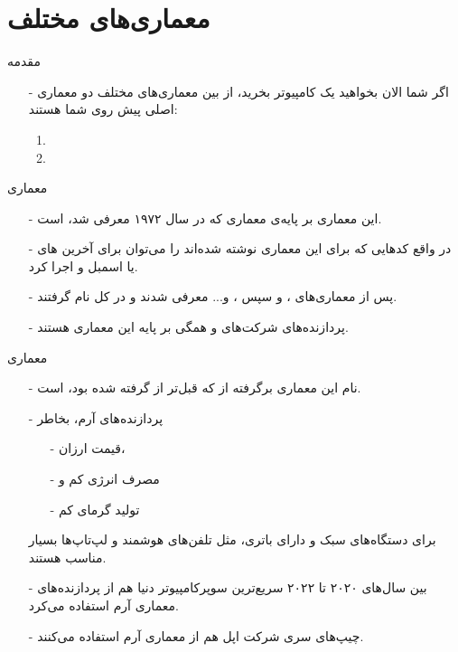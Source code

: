 \section{معماری‌های مختلف}
\begin{frame}{مقدمه}
\begin{itemize}\itemr
\item[-]
اگر شما الان بخواهید یک کامپیوتر بخرید، از بین معماری‌های مختلف دو معماری اصلی پیش روی شما هستند:
\begin{enumerate}\itemr
\item {}
\item {}
\end{enumerate}
\end{itemize}
\end{frame}

\begin{frame}{معماری }
\begin{itemize}\itemr
\item[-]
این معماری بر پایه‌ی معماری 
که در سال ۱۹۷۲ معرفی شد، است.
\item[-]
در واقع کد‌هایی که برای این معماری نوشته شده‌اند را می‌توان برای آخرین 
های
یا
اسمبل و اجرا کرد.
\item[-]
پس از
معماری‌های
،
 و سپس
،
و... معرفی شدند و در کل 
نام گرفتند.
\item[-]
پردازنده‌های شرکت‌های 
و 
همگی بر پایه این معماری هستند.
\end{itemize}
\end{frame}

\begin{frame}{معماری }
\begin{itemize}\itemr
\item[-]
نام این معماری برگرفته از 
که قبل‌تر از
گرفته شده بود، است.
\item[-]
پردازنده‌های آرم، بخاطر 
\begin{itemize}\itemr
\item[-]
قیمت ارزان،
\item[-]
مصرف انرژی کم و
\item[-]
تولید گرمای کم
\end{itemize}
\begin{flushright}
برای دستگاه‌های سبک و دارای باتری، مثل تلفن‌های هوشمند و لپ‌تاپ‌ها بسیار مناسب هستند.
\end{flushright}

\item[-]
بین سال‌های ۲۰۲۰ تا ۲۰۲۲ سریع‌ترین سوپرکامپیوتر دنیا 
هم از پردازنده‌های معماری آرم استفاده می‌کرد.
\item[-]
چیپ‌های سری  شرکت اپل هم از معماری آرم استفاده می‌کنند.
\end{itemize}
\end{frame}